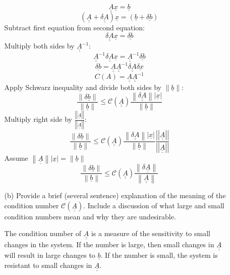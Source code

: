 \documentclass{article}
\begin{document}
\begin{enumerate}
\begin{itemize}
      \medskip
      
      $$\underline{\underline{A}} \underline{x} = \underline{b}$$
      $$(\underline{\underline{A}} + \underline{\underline{\delta A}}) \underline{x} = (\underline{b} + \underline{\delta b})$$
      Subtract first equation from second equation:
      $$\underline{\underline{\delta A}} \underline{x} = \underline{\delta b}$$
      Multiply both sides by $\underline{\underline{A}}^{-1}$:
      $$\underline{\underline{A}}^{-1} \underline{\underline{\delta A}}\underline{x} = \underline{\underline{A}}^{-1} \underline{\delta b}$$
      $$\underline{\delta b} = \underline{\underline{A}} \underline{\underline{A}}^{-1} \underline{\underline{\delta A}}\underline{\delta x}$$
      $$C(A) = \underline{\underline{A}} \underline{\underline{A}}^{-1}$$
      Apply Schwarz inequality and divide both sides by $\left\| \underline{b} \right\|$:
      $$\frac{\left\| \delta \underline{b} \right\|}{ \left\| \underline{b} \right\| } \le   \mathcal{C} (\underline{\underline{A}}) \frac{ \left\| \underline{\underline{\delta A}}   \right\| \left| \underline{x} \right|}{\left\| \underline{b} \right\|}$$
      Multiply right side by $\frac{\left|\left| \underline{\underline{A}} \right|\right|}{\left|\left| \underline{\underline{A}} \right|\right|}$:
      $$\frac{\left\| \delta \underline{b} \right\|}{ \left\| \underline{b} \right\| } \le   \mathcal{C} (\underline{\underline{A}}) \frac{ \left\| \underline{\underline{\delta A}}   \right\| \left| \underline{x} \right|}{\left\| \underline{b} \right\|} \frac{\left|\left| \underline{\underline{A}} \right|\right|}{\left|\left| \underline{\underline{A}} \right|\right|}$$
      Assume $\left\| \underline{\underline{A}}   \right\| \left| \underline{x} \right| = \left\| \underline{b} \right\|$
      $$\boxed{ \frac{\left\| \delta \underline{b} \right\|}{ \left\| \underline{b} \right\| } \le   \mathcal{C} (\underline{\underline{A}}) \frac{ \left\| \delta \underline{\underline{A}}   \right\| }{\left\| \underline{\underline{A}} \right\|}}$$
      
            
    \item[(b)] Provide a brief (several sentence) explanation of the meaning of the condition number $\mathcal{C}(\underline{\underline{A}})$.  Include a discussion of what large and small condition numbers mean and why they are undesirable.  
    
    \medskip
    
     \quad The condition number of $\underline{\underline{A}}$ is a measure of the sensitivity to small changes in the system. If the number is large, then small changes in $\underline{\underline{A}}$ will result in large changes to $\underline{b}$. If the number is small, the system is resistant to small changes in $\underline{\underline{A}}$.
    \end{itemize}
    

\end{enumerate}
\end{document}
